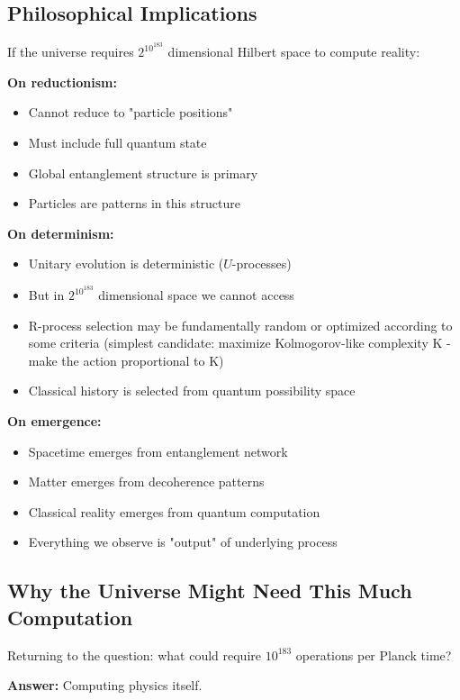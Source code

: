 ﻿\documentclass{article}
\begin{document}
\subsection{Philosophical Implications}


If the universe requires $2^{10^{183}}$ dimensional Hilbert space to compute reality:


\textbf{On reductionism:}
\begin{itemize}
\item Cannot reduce to "particle positions"
\item Must include full quantum state
\item Global entanglement structure is primary
\item Particles are patterns in this structure
\end{itemize}


\textbf{On determinism:}
\begin{itemize}
\item Unitary evolution is deterministic ($U$-processes)
\item But in $2^{10^{183}}$ dimensional space we cannot access
\item R-process selection may be fundamentally random or optimized according to some criteria (simplest candidate: maximize Kolmogorov-like complexity K - make the action proportional to K)
\item Classical history is selected from quantum possibility space
\end{itemize}


\textbf{On emergence:}
\begin{itemize}
\item Spacetime emerges from entanglement network
\item Matter emerges from decoherence patterns
\item Classical reality emerges from quantum computation
\item Everything we observe is "output" of underlying process
\end{itemize}


\subsection{Why the Universe Might Need This Much Computation}


Returning to the question: what could require $10^{183}$ operations per Planck time?


\textbf{Answer:} Computing physics itself.
\end{document}
